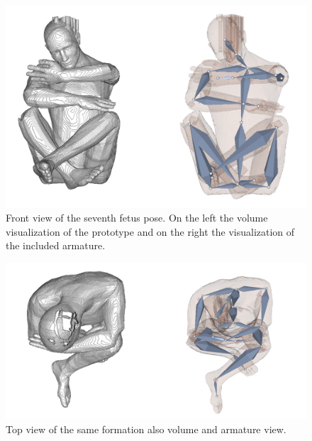 \newpage
\begin{figure} [htb!]
    \centering
	\includegraphics[width=13cm]{content/images/results/man7Front.png}
	\caption{Front view of the seventh fetus pose. On the left the volume visualization of the prototype and on the right the visualization of the included armature.}
	\label{fig:}
\end{figure}
\begin{figure} [htb!]
    \centering
	\includegraphics[width=13cm]{content/images/results/man7Top.png}
	\caption{Top view of the same formation also volume and armature view.}
	\label{fig:}
\end{figure}

